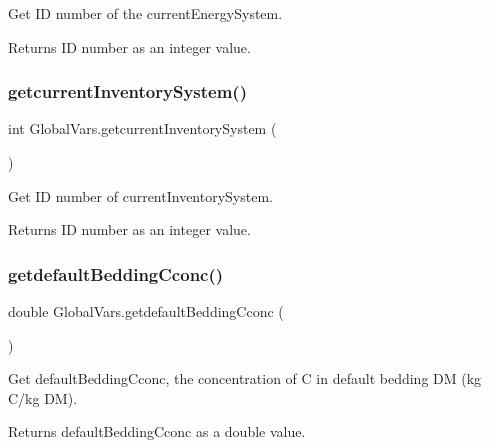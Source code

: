Get ID number of the current\+Energy\+System. 

\begin{DoxyReturn}{Returns}
ID number as an integer value. 
\end{DoxyReturn}
\mbox{\label{class_global_vars_a59cda0c07140dd5fd81caaa15bad6c0f}} 
\subsubsection{\texorpdfstring{getcurrentInventorySystem()}{getcurrentInventorySystem()}}
{\footnotesize\ttfamily int Global\+Vars.\+getcurrent\+Inventory\+System (\begin{DoxyParamCaption}{ }\end{DoxyParamCaption})\hspace{0.3cm}{\ttfamily [inline]}}



Get ID number of current\+Inventory\+System. 

\begin{DoxyReturn}{Returns}
ID number as an integer value. 
\end{DoxyReturn}
\mbox{\label{class_global_vars_a00271cd8374815fb712fd09d1fed33ec}} 
\subsubsection{\texorpdfstring{getdefaultBeddingCconc()}{getdefaultBeddingCconc()}}
{\footnotesize\ttfamily double Global\+Vars.\+getdefault\+Bedding\+Cconc (\begin{DoxyParamCaption}{ }\end{DoxyParamCaption})\hspace{0.3cm}{\ttfamily [inline]}}



Get default\+Bedding\+Cconc, the concentration of C in default bedding DM (kg C/kg DM). 

\begin{DoxyReturn}{Returns}
default\+Bedding\+Cconc as a double value. 
\end{DoxyReturn}
\mbox{\label{class_global_vars_af89c033bb754a4798708e8ebb406c007}} 
